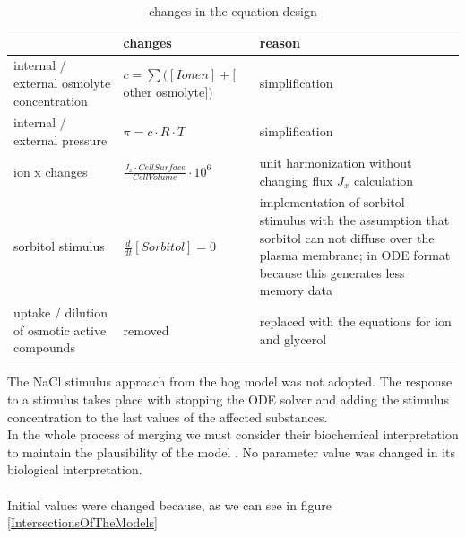 \begin{table} [h]
	\footnotesize
\begin{center} 
	\caption{changes in the equation design}
\begin{tabular} {p{3.5cm} l p{6cm} }
\toprule
& changes & reason\\
\midrule
internal / external osmolyte concentration & $c = \sum ([Ionen]+[$other osmolyte$])$ & simplification\\ 
\addlinespace[9pt]
internal / external pressure & $\pi = c \cdot R \cdot T	$ & simplification\\
\addlinespace[9pt]
ion x changes & $\frac{J_x \cdot CellSurface}{CellVolume} \cdot 10^{6}$ & unit harmonization without changing flux $J_x$ calculation\\
\addlinespace[9pt]
sorbitol stimulus & $\frac{d}{dt}[Sorbitol]=0$ & implementation of sorbitol stimulus with the assumption that sorbitol can not diffuse over the plasma membrane; in ODE format because this generates less memory data\\
\addlinespace[9pt]
uptake / dilution of osmotic active compounds & removed & replaced with the equations for ion and glycerol\\
\bottomrule
\end{tabular}
\label{changesOnTheModels}
\end{center}
\end{table}
The NaCl stimulus approach from the hog model was not adopted. The response to a stimulus takes place with stopping the ODE solver and adding the stimulus concentration to the last values of the affected substances.\\
In the whole process of merging we must consider their biochemical interpretation to maintain the plausibility of the model \cite{Liebermeister2008ValidityAC}. No parameter value was changed in its biological interpretation.\\\\
Initial values were changed because, as we can see in figure \ref{IntersectionsOfTheModels}

